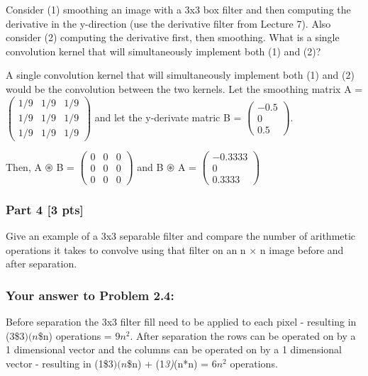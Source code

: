 \documentclass[11pt]{article}
\begin{document}
Consider (1) smoothing an image with a 3x3 box filter and then computing
the derivative in the y-direction (use the derivative filter from
Lecture 7). Also consider (2) computing the derivative first, then
smoothing. What is a single convolution kernel that will simultaneously
implement both (1) and (2)?

A single convolution kernel that will simultaneously implement both (1)
and (2) would be the convolution between the two kernels. Let the
smoothing matrix A =
\(\left(\begin{array}{ccc} 1/9 & 1/9 & 1/9 \\ 1/9 & 1/9 & 1/9 \\ 1/9 & 1/9 & 1/9 \end{array}\right)\)
and let the y-derivate matric B =
\(\left(\begin{array}{ccc} -0.5 \\ 0 \\ 0.5 \end{array}\right)\).

Then, A \(\circledast\) B =
\(\left(\begin{array}{ccc} 0 & 0 & 0 \\ 0 & 0 & 0 \\ 0 & 0 & 0 \end{array}\right)\)
and B \(\circledast\) A =
\(\left(\begin{array}{ccc} -0.3333 \\ 0 \\ 0.3333 \end{array}\right)\)

    \hypertarget{part-4-3-pts}{%
\subsubsection{Part 4 {[}3 pts{]}}\label{part-4-3-pts}}

Give an example of a 3x3 separable filter and compare the number of
arithmetic operations it takes to convolve using that filter on an n × n
image before and after separation.

    \hypertarget{your-answer-to-problem-2.4}{%
\subsubsection{Your answer to Problem
2.4:}\label{your-answer-to-problem-2.4}}

Before separation the 3x3 filter fill need to be applied to each pixel -
resulting in (3\$\cdot\(3)\)\cdot\((n\)\cdot\$n) operations =
\(9n^{2}\). After separation the rows can be operated on by a 1
dimensional vector and the columns can be operated on by a 1 dimensional
vector - resulting in (1\$\cdot\(3)\)\cdot\((n\)\cdot\$n) +
(1\emph{3)}(n*n) = \(6n^{2}\) operations.
\end{document}
